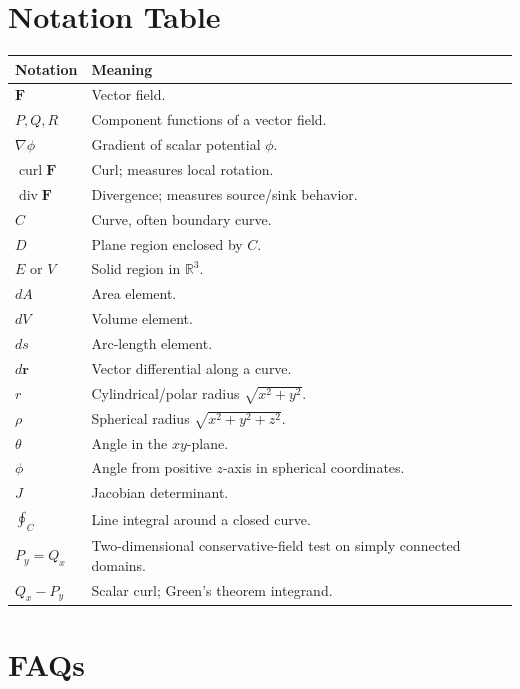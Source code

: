 \documentclass[11pt]{article}
\newcommand{\R}{\mathbb{R}}
\newcommand{\grad}{\nabla}
\newcommand{\curl}{\operatorname{curl}}
\newcommand{\divg}{\operatorname{div}}
\begin{document}
\section{Notation Table}

\begin{longtable}{>{\raggedright\arraybackslash}p{}>{\raggedright\arraybackslash}p{}}
\toprule
Notation & Meaning \\
\midrule
$\mathbf F$ & Vector field.\\
$P,Q,R$ & Component functions of a vector field.\\
$\grad\phi$ & Gradient of scalar potential $\phi$.\\
$\curl\mathbf F$ & Curl; measures local rotation.\\
$\divg\mathbf F$ & Divergence; measures source/sink behavior.\\
$C$ & Curve, often boundary curve.\\
$D$ & Plane region enclosed by $C$.\\
$E$ or $V$ & Solid region in $\R^3$.\\
$dA$ & Area element.\\
$dV$ & Volume element.\\
$ds$ & Arc-length element.\\
$d\mathbf r$ & Vector differential along a curve.\\
$r$ & Cylindrical/polar radius $\sqrt{x^2+y^2}$.\\
$\rho$ & Spherical radius $\sqrt{x^2+y^2+z^2}$.\\
$\theta$ & Angle in the $xy$-plane.\\
$\phi$ & Angle from positive $z$-axis in spherical coordinates.\\
$J$ & Jacobian determinant.\\
$\oint_C$ & Line integral around a closed curve.\\
$P_y=Q_x$ & Two-dimensional conservative-field test on simply connected domains.\\
$Q_x-P_y$ & Scalar curl; Green's theorem integrand.\\
\bottomrule
\end{longtable}

\section{FAQs}
\end{document}
